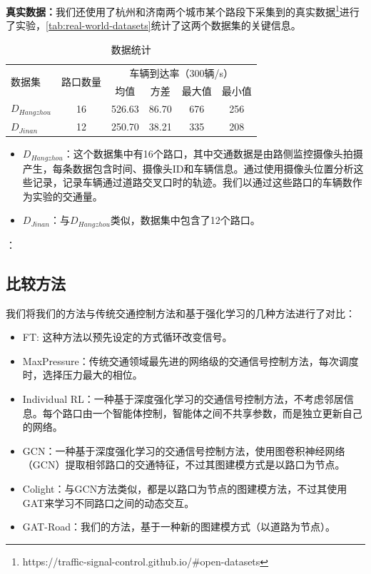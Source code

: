 \textbf{真实数据：}我们还使用了杭州和济南两个城市某个路段下采集到的真实数据\footnote{https://traffic-signal-control.github.io/\#open-datasets}进行了实验，\autoref{tab:real-world-datasets}统计了这两个数据集的关键信息。
\begin{table}[htb]
  \caption{数据统计}
  \label{tab:real-world-datasets}
  \begin{tabular}{lccccc}
  \toprule
  \multirow{2}{*}{数据集} & \multirow{2}{*}{路口数量} & \multicolumn{4}{c}{车辆到达率（300辆/s）} \\
  & & \multicolumn{1}{c}{均值} & \multicolumn{1}{c}{方差} & \multicolumn{1}{c}{最大值} & \multicolumn{1}{c}{最小值} \\
  \midrule
  $D_{Hangzhou}$ & 16 & 526.63 & 86.70 & 676 & 256 \\
  $D_{Jinan}$ & 12 & 250.70 & 38.21 & 335 & 208 \\
  \bottomrule
  \end{tabular}
\end{table}
\begin{itemize}
  \item $D_{Hangzhou}$：这个数据集中有16个路口，其中交通数据是由路侧监控摄像头拍摄产生，每条数据包含时间、摄像头ID和车辆信息。通过使用摄像头位置分析这些记录，记录车辆通过道路交叉口时的轨迹。我们以通过这些路口的车辆数作为实验的交通量。
  \item $D_{Jinan}$：与$D_{Hangzhou}$类似，数据集中包含了12个路口。
\end{itemize}：

\subsection{比较方法}
我们将我们的方法与传统交通控制方法和基于强化学习的几种方法进行了对比：
\begin{itemize}
  \item FT\cite{koonce2008traffic}: 这种方法以预先设定的方式循环改变信号。
  \item MaxPressure\cite{varaiya2013max}：传统交通领域最先进的网络级的交通信号控制方法，每次调度时，选择压力最大的相位。
  \item Individual RL\cite{wei2018intellilight}：一种基于深度强化学习的交通信号控制方法，不考虑邻居信息。每个路口由一个智能体控制，智能体之间不共享参数，而是独立更新自己的网络。
  \item GCN\cite{van2016coordinated}：一种基于深度强化学习的交通信号控制方法，使用图卷积神经网络（GCN）提取相邻路口的交通特征，不过其图建模方式是以路口为节点。
  \item Colight\cite{wei2019colight}：与GCN方法类似，都是以路口为节点的图建模方法，不过其使用GAT来学习不同路口之间的动态交互。
  \item GAT-Road：我们的方法，基于一种新的图建模方式（以道路为节点）。
\end{itemize}
